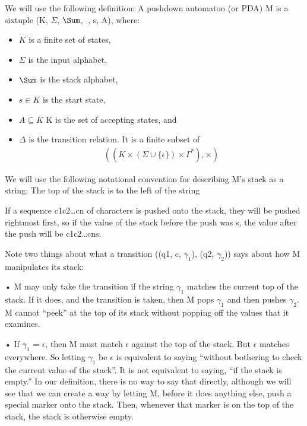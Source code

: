 \documentclass{article}
\begin{document}
We will use the following definition:  A pushdown automaton (or PDA) M is a
sixtuple (K, $\Sigma$, $\Sum$, , s, A), where: 
 
\begin{itemize}
	\item $K$ is a finite set of states, 
	\item $\Sigma$ is the input alphabet, 
	\item $\Sum$ is the stack alphabet, 
	\item $s \in K$ is the start state, 
	\item $A \subseteq K$ K is the set of accepting states, and 
	\item $\Delta$ is the transition relation.  It is a finite subset of  
\begin{align*}
\left(
    \left( K \times (\Sigma \cup \{\epsilon\}) \times \Gamma^* \right),
    \times
\right)
\end{align*}
\end{itemize}

 We will use the following notational convention for describing M’s stack as a
 string:  The top of the stack is to the left of the string

If a sequence c1c2…cn of characters is pushed onto the stack, they will be
pushed rightmost first, so if the value of the stack before the push was s, the
value after the push will be c1c2…cns.   

Note two things about what a transition ((q1, c, $\gamma_1$), (q2, $\gamma_2$))
says about how M manipulates its stack:
 
• M may only take the transition if the string $\gamma_1$ matches the current top of
the stack.  If it does, and the transition is taken, then M pops $\gamma_1$ and then
pushes $\gamma_2$.  M cannot “peek” at the top of its stack without popping off the
values that it examines. 
 
• If $\gamma_1$ = $\epsilon$, then M must match $\epsilon$ against the top of the stack.  But $\epsilon$ matches
everywhere.  So letting $\gamma_1$ be $\epsilon$ is equivalent to saying “without bothering to
check the current value of the stack”.  It is not equivalent to saying, “if the
stack is empty.”  In our definition, there is no way to say that directly,
although we will see that we can create a way by letting M, before it does
anything else, push a special marker onto the stack.  Then, whenever that
marker is on the top of the stack, the stack is otherwise empty. 
\end{document}
